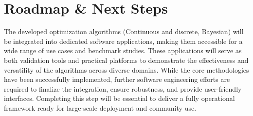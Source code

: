\section{Roadmap \& Next Steps}

The developed optimization algorithms (Continuous and discrete, Bayesian) will be integrated into dedicated software applications, making them accessible for a wide range of use cases and benchmark studies. These applications will serve as both validation tools and practical platforms to demonstrate the effectiveness and versatility of the algorithms across diverse domains. While the core methodologies have been successfully implemented, further software engineering efforts are required to finalize the integration, ensure robustness, and provide user-friendly interfaces. Completing this step will be essential to deliver a fully operational framework ready for large-scale deployment and community use.


